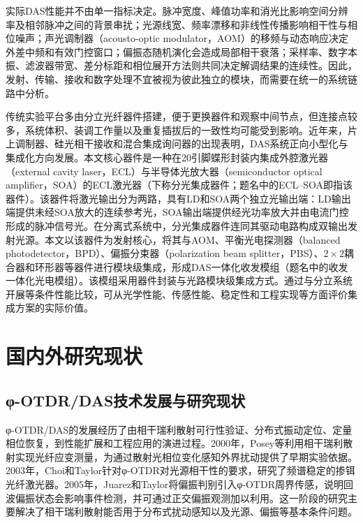 实际DAS性能并不由单一指标决定。脉冲宽度、峰值功率和消光比影响空间分辨率及相邻脉冲之间的背景串扰；光源线宽、频率漂移和非线性传播影响相干性与相位噪声；声光调制器（acousto-optic modulator，AOM）的移频与动态响应决定外差中频和有效门控窗口；偏振态随机演化会造成局部相干衰落；采样率、数字本振、滤波器带宽、差分标距和相位展开方法则共同决定解调结果的连续性\cite{martins2013modulation,ren2016extinction,lu2021detection,lu2022phaseerror,zhong2021frequency,zhao2024frequency,qian2025drift}。因此，发射、传输、接收和数字处理不宜被视为彼此独立的模块，而需要在统一的系统链路中分析。

传统实验平台多由分立光纤器件搭建，便于更换器件和观察中间节点，但连接点较多，系统体积、装调工作量以及重复插拔后的一致性均可能受到影响。近年来，片上调制器、硅光相干接收和混合集成询问器的出现表明，DAS系统正向小型化与集成化方向发展\cite{cheng2023onchip,jin2024integrated,jin2026hybrid}。本文核心器件是一种在20引脚蝶形封装内集成外腔激光器（external cavity laser，ECL）与半导体光放大器（semiconductor optical amplifier，SOA）的ECL激光器（下称分光集成器件；题名中的ECL--SOA即指该器件）。该器件将激光输出分为两路，具有LD和SOA两个独立光输出端：LD输出端提供未经SOA放大的连续参考光，SOA输出端提供经光功率放大并由电流门控形成的脉冲信号光。在分离式系统中，分光集成器件连同其驱动电路构成双输出发射光源。本文以该器件为发射核心，将其与AOM、平衡光电探测器（balanced photodetector，BPD）、偏振分束器（polarization beam splitter，PBS）、$2\times2$耦合器和环形器等器件进行模块级集成，形成DAS一体化收发模组（题名中的收发一体化光电模组）。该模组采用器件封装与光路模块级集成方式。通过与分立系统开展等条件性能比较，可从光学性能、传感性能、稳定性和工程实现等方面评价集成方案的实际价值。

\section{国内外研究现状}

\subsection{φ-OTDR/DAS技术发展与研究现状}

φ-OTDR/DAS的发展经历了由相干瑞利散射可行性验证、分布式振动定位、定量相位恢复，到性能扩展和工程应用的演进过程。2000年，Posey等利用相干瑞利散射实现光纤应变测量，为通过散射光相位变化感知外界扰动提供了早期实验依据\cite{posey2000strain}。2003年，Choi和Taylor针对φ-OTDR对光源相干性的要求，研究了频谱稳定的掺铒光纤激光器\cite{choi2003stable}。2005年，Juarez和Taylor将偏振判别引入φ-OTDR周界传感，说明回波偏振状态会影响事件检测，并可通过正交偏振观测加以利用\cite{juarez2005polarization}。这一阶段的研究主要解决了相干瑞利散射能否用于分布式扰动感知以及光源、偏振等基本条件问题。

